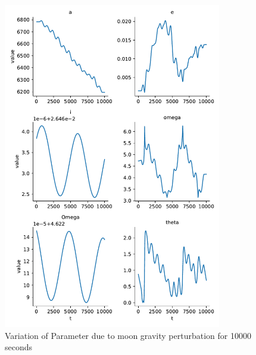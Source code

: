 \begin{figure}[H]
    \centering
    \includegraphics[width=0.85\textwidth]{../Figure/Q2/orbital_elements_variation_moon_10000}
    \caption{Variation of Parameter due to moon gravity perturbation for 10000 seconds}
\end{figure}